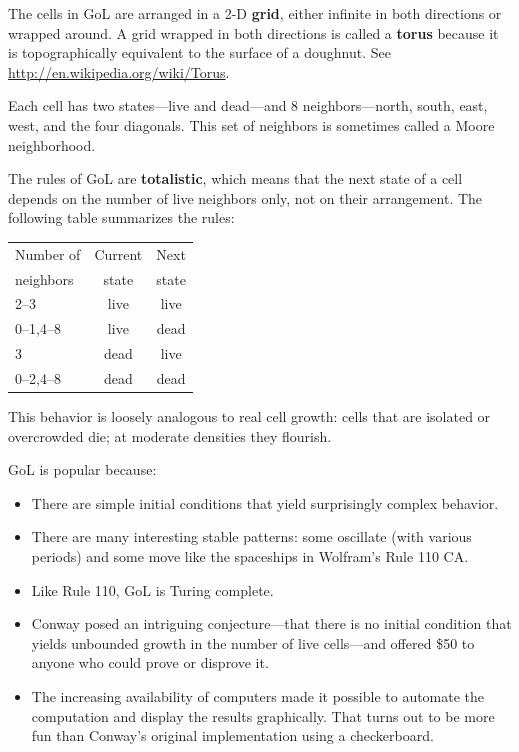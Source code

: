 \documentclass[10pt]{book}
\begin{document}
The cells in GoL are arranged in a 2-D {\bf grid},
either infinite in both
directions or wrapped around.  A grid wrapped
in both directions is called a {\bf torus} because it is topographically
equivalent to the surface of a doughnut.
See \url{http://en.wikipedia.org/wiki/Torus}.

Each cell has two states---live and dead---and 8 neighbors---north,
south, east, west, and the four diagonals.  This set of neighbors
is sometimes called a Moore neighborhood.

The rules of GoL are {\bf totalistic}, which means that the next
state of a cell depends on the number of live neighbors only,
not on their arrangement.  The following table summarizes the
rules:

\begin{tabular}{|l|c|c|}
\hline
Number of     &   Current      & Next \\
neighbors     &   state        & state \\
\hline
2--3          &   live           & live         \\
0--1,4--8     &   live           & dead         \\
3             &   dead           & live         \\
0--2,4--8     &   dead           & dead         \\
\hline
\end{tabular}

This behavior is loosely analogous to real cell growth: cells
that are isolated or overcrowded die; at moderate densities they
flourish.

GoL is popular because:

\begin{itemize}

\item There are simple initial conditions that yield
surprisingly complex behavior.

\item There are many interesting stable patterns: some
oscillate (with various periods) and some move like the
spaceships in Wolfram's Rule 110 CA.

\item Like Rule 110, GoL is Turing complete.

\item Conway posed an intriguing conjecture---that there is
no initial condition that yields unbounded growth in the number
of live cells---and offered \$50 to anyone who could prove
or disprove it.

\item The increasing availability of computers made it possible
to automate the computation and display the results graphically.
That turns out to be more fun than Conway's original implementation
using a checkerboard.

\end{itemize}
\end{document}
